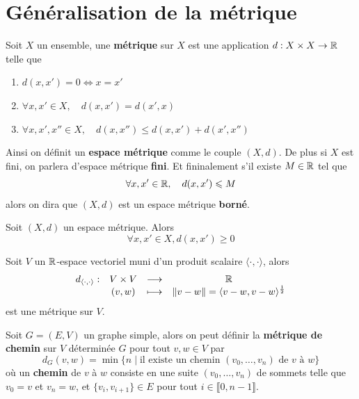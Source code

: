 \section{Généralisation de la métrique}
\begin{definition} \label{def: Espace métrique}
	Soit $X$ un ensemble, une \textbf{métrique} sur $X$ est une application $d : X \times X \to \mathbb{R}$ telle que
	\begin{enumerate}
		\item $d(x,x') = 0 \iff x = x'$
		\item $\forall x,x' \in X, \quad d(x,x') = d(x', x)$
		\item $\forall x,x',x'' \in X, \quad d(x,x'') \leqslant d(x,x') + d(x',x'')$
	\end{enumerate}
	Ainsi on définit un \textbf{espace métrique} comme le couple $(X,d)$. De plus si $X$ est fini, on parlera d'espace métrique \textbf{fini}. Et fininalement s'il existe $M \in \mathbb{R}$ tel que 
	\[
	\forall x, x' \in \mathbb{R}, \quad d(x,x') \leqslant M
	\]
	alors on dira que $(X,d)$ est un espace métrique \textbf{borné}.
\end{definition}

\begin{lemme}[Positivité] \label{Positivité}
	Soit $(X,d)$ un espace métrique. Alors 
	\[
	\forall x,x' \in X, d(x,x') \geqslant 0
	\]
\end{lemme}

\begin{exemple}
		Soit $V$ un $\mathbb{R}$-espace vectoriel muni d'un produit scalaire $\langle \cdot,\cdot \rangle$, alors 
		\[
		\begin{array}{cccc}
		d_{\langle \cdot, \cdot \rangle} :& V \times V &\longrightarrow &\mathbb{R} \\ &(v,w) &\longmapsto &\left\| v - w \right\| = \langle v -w, v-w \rangle^\frac12
		\end{array}
		\]
		est une métrique sur $V$.

\end{exemple}

\begin{exemple}
	Soit $G= (E,V)$ un graphe simple, alors on peut définir la \textbf{métrique de chemin} sur $V$ déterminée $G$ pour tout $v,w \in V$ par
	\[
	d_G(v,w) = \min \{ n \mid \text{il existe un chemin $(v_0, \ldots, v_n)$ de $v$ à $w$}\}
	\]
	où un \textbf{chemin} de $v$ à $w$ consiste en une suite $(v_0, \ldots, v_n)$ de sommets telle que $v_0 = v$ et $v_n = w$, et $\{v_i, v_{i+1}\} \in E$ pour tout $i \in \llbracket 0, n-1 \rrbracket$.	
\end{exemple}


